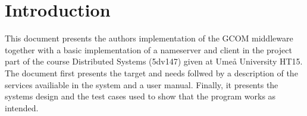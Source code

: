 \section{Introduction}
This document presents the authors implementation of the GCOM middleware together with a basic implementation of a  nameserver and client in the project part of the course Distributed Systems (5dv147) given at Umeå University HT15. 
The document first presents the target and needs follwed by a description of the services availiable in the system and a user manual. Finally, it presents the systems design and the test cases used to show that the program works as intended. 